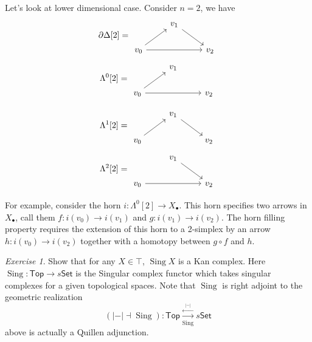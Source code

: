 \documentclass[11pt]{amsart}
\numberwithin{equation}{section}
\theoremstyle{definition}
\theoremstyle{remark}
\newtheorem{exer}[thm]{Exercise}
\numberwithin{equation}{section}
\newcommand{\set}{\mathsf{Set}}
\newcommand{\Top}{\mathsf{Top}}
\newcommand{\sing}{\operatorname{Sing}}
\begin{document}
Let's look at lower dimensional case. Consider $n=2$, we have 
\begin{equation*}
\partial \Delta[2] = \begin{tikzcd}
& v_1 \arrow[rd] &   \\
v_0 \arrow[ru] \arrow[rr] &              & v_2
\end{tikzcd}
\end{equation*}
\begin{equation*}
\Lambda^0[2] = \begin{tikzcd}
& v_1  &   \\
v_0 \arrow[ru] \arrow[rr] &              & v_2
\end{tikzcd}
\end{equation*}

\begin{equation*}
\Lambda^1[2] = \begin{tikzcd}
& v_1 \arrow[rd] &   \\
v_0 \arrow[ru] &              & v_2
\end{tikzcd}
\end{equation*}
\begin{equation*}
\Lambda^2[2] = \begin{tikzcd}
& v_1 \arrow[rd] &   \\
v_0  \arrow[rr] &              & v_2
\end{tikzcd}
\end{equation*}

For example, consider the horn $i:\Lambda^0[2]\to X_{\bullet}$. This horn specifies two arrows in $X_{\bullet}$, call them $f: i(v_0)\to i(v_1)$ and $g:i(v_1)\to i(v_2)$. The horn filling property requires the extension of this horn to a 2-simplex by an arrow $h: i(v_0)\to i(v_2)$ together with a homotopy between $g\circ f$ and $h$.

\begin{exer}
	Show that for any $X\in \top$, $\sing X$ is a Kan complex. Here $\sing: \Top \to s\set$ is the Singular complex functor which takes singular complexes for a given topological spaces. Note that $\sing$ is right adjoint to the geometric realization
	\begin{equation*}
	({\vert- \vert} \dashv \sing) \colon \Top \stackrel{\overset{{|-|}}{\longleftarrow}}{\underset{\sing}{\longrightarrow}} s\set
	\end{equation*}
	above is actually a Quillen adjunction.
	\end{exer}
\end{document}
